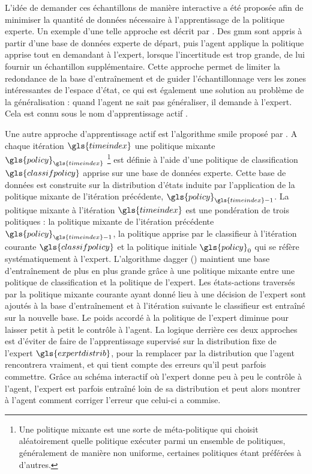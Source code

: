 \documentclass[frenchb,a4paper,justified,notoc]{tufte-book}
\newcommand{\classifpolicy}{\gls{classifpolicy}}
\newcommand{\policy}{\gls{policy}}
\newcommand{\timeindex}{\gls{timeindex}}
\newcommand{\expertdistrib}{\gls{expertdistrib}}
\begin{document}
L'idée de demander ces échantillons de manière interactive a été proposée afin de minimiser la quantité de données nécessaire à l'apprentissage de la politique experte. Un exemple d'une telle approche est décrit par \citet{chernova2007confidence}. Des \gls{gmm} sont appris à partir d'une base de données experte de départ, puis l'agent applique la politique apprise tout en demandant à l'expert, lorsque l'incertitude est trop grande, de lui fournir un échantillon supplémentaire. Cette approche permet de limiter la redondance de la base d'entraînement et de guider l'échantillonnage vers les zones intéressantes de l'espace d'état, ce qui est également une solution au problème de la généralisation : quand l'agent ne sait pas généraliser, il demande à l'expert. Cela est connu sous le nom d'apprentissage actif \citep{cohn1996active}.

Une autre approche d'apprentissage actif est l'algorithme \gls{smile} proposé par \citet{ross2010efficient}. A chaque itération $\timeindex$ une politique mixante $\policy_{\timeindex}$ \footnote{Une politique mixante est une sorte de méta-politique qui choisit aléatoirement quelle politique exécuter parmi un ensemble de politiques, généralement de manière non uniforme, certaines politiques étant préférées à d'autres.
 } est définie à l'aide d'une politique de classification $\classifpolicy$ apprise sur une base de données experte. Cette base de données est construite sur la distribution d'états induite par l'application de la politique mixante de l'itération précédente, $\policy_{\timeindex-1}$. La politique mixante à l'itération $\timeindex$ est une pondération de trois politiques : la politique mixante de l'itération précédente $\policy_{\timeindex-1}$, la politique apprise par le classifieur à l'itération courante $\classifpolicy$ et la politique initiale $\policy_{0}$ qui se réfère systématiquement à l'expert. L'algorithme \gls{dagger} (\citet{ross2010reduction}) maintient une base d'entraînement de plus en plus grande grâce à une politique mixante entre une politique de classification et la politique de l'expert. Les états-actions traversés par la politique mixante courante ayant donné lieu à une décision de l'expert sont ajoutés à la base d'entraînement et à l'itération suivante le classifieur est entraîné sur la nouvelle base. Le poids accordé à la politique de l'expert diminue pour laisser petit à petit le contrôle à l'agent. La logique derrière ces deux approches est d'éviter de faire de l'apprentissage supervisé sur la distribution fixe de l'expert $\expertdistrib$, pour la remplacer par la distribution que l'agent rencontrera vraiment, et qui tient compte des erreurs qu'il peut parfois commettre. Grâce au schéma interactif où l'expert donne peu à peu le contrôle à l'agent, l'expert est parfois entraîné loin de sa distribution et peut alors montrer à l'agent comment corriger l'erreur que celui-ci a commise.
\end{document}
